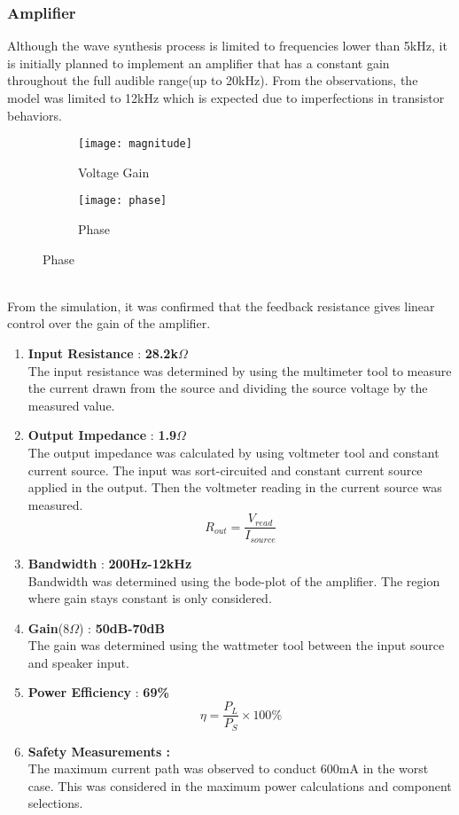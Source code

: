 \subsubsection*{Amplifier}
Although the wave synthesis process is limited to frequencies lower than 5kHz, it is initially planned to implement an amplifier that has a constant gain throughout the full audible range(up to 20kHz). From the observations, the model was limited to 12kHz which is expected due to imperfections in transistor behaviors.
\begin{figure}[h]
    \begin{subfigure}{.48\columnwidth}
        \texttt{[image: magnitude]}
        \caption*{Voltage Gain}
    \end{subfigure}
    \begin{subfigure}{.48\columnwidth}
        \texttt{[image: phase]}
        \caption*{Phase}
    \end{subfigure}
\end{figure}
\\
From the simulation, it was confirmed that the feedback resistance gives linear control over the gain of the amplifier.
\begin{enumerate}
    \item \textbf{Input Resistance} : \textbf{28.2k$\Omega$}\\The input resistance was determined by using the multimeter tool to measure the current drawn from the source and dividing the source voltage by the measured value.
    \item \textbf{Output Impedance} : \textbf{1.9$\Omega$}\\The output impedance was calculated by using voltmeter tool and constant current source. The input was sort-circuited and constant current source applied in the output. Then the voltmeter reading in the current source was measured.
          $$R_{out}=\frac{V_{read}}{I_{source}}$$
    \item \textbf{Bandwidth} : \textbf{200Hz-12kHz}\\Bandwidth was determined using the bode-plot of the amplifier. The region where gain stays constant is only considered.
    \item \textbf{Gain}(8$\Omega$) : \textbf{50dB-70dB}\\The gain was determined using the wattmeter tool between the input source and speaker input.
    \item \textbf{Power Efficiency} : \textbf{69\%}\\
          $$\eta=\frac{P_L}{P_S}\times 100\%$$
    \item \textbf{Safety Measurements :} \\
          The maximum current path was observed to conduct 600mA in the worst case. This was considered in the maximum power calculations and component selections.
\end{enumerate}

